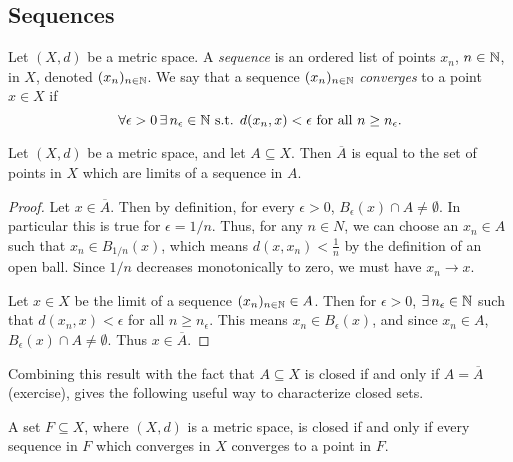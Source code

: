 \documentclass{article}
\begin{document}
\subsection{Sequences}

\begin{definition}
Let $(X,d)$ be a metric space. A \emph{sequence} is an ordered list of points $x_n$, $n\in{\mathbb{N}}$, in $X$, denoted $(x_n)_{n \in {\mathbb{N}}}$. We say that a sequence $(x_n)_{n \in {\mathbb{N}}}$ \emph{converges} to a point $x \in X$ if 
\begin{equation*}
    \forall \epsilon > 0 \, \exists \, n_\epsilon \in {\mathbb{N}} \text{ s.t. } d(x_n,x) < \epsilon \text{ for all } n \geq n_\epsilon .
\end{equation*}
\end{definition}

\begin{proposition}
\label{prop:closure_limit}
Let $(X, d)$ be a metric space, and let $A \subseteq X$. Then $\overline A$ is equal to the set of points in $X$ which are limits of a sequence in $A$.
\end{proposition}

\begin{proof}
Let $x \in \overline A$. Then by definition, for every $\epsilon > 0$, $B_\epsilon(x) \cap A \neq \emptyset$. In particular this is true for $\epsilon = 1/n$. Thus, for any $n \in N$, we can choose an $x_n \in A$ such that $x_n \in B_{1/n}(x)$, which means $d(x,x_n) < \frac{1}{n}$ by the definition of an open ball. Since $1/n$ decreases monotonically to zero, we must have $x_n \to x$.

Let $x \in X$ be the limit of a sequence $(x_n)_{n \in {\mathbb{N}}} \in A$. Then for $\epsilon > 0$, $\exists \, n_\epsilon \in {\mathbb{N}}$ such that $d(x_n,x) < \epsilon$ for all $n \geq n_\epsilon$. This means $x_n \in B_\epsilon(x)$, and since $x_n \in A$, $B_\epsilon(x) \cap A \neq \emptyset$. Thus $x \in \overline A$.
\end{proof}

Combining this result with the fact that $A \subseteq X$ is closed if and only if $A = \overline A$ (exercise), gives the following useful way to characterize closed sets. 

\begin{corollary}
\label{cor:closed_converge}
A set $F \subseteq X$, where $(X, d)$ is a metric space, is closed if and only if every sequence in $F$ which converges in $X$ converges to a point in $F$.
\end{corollary}
\end{document}
